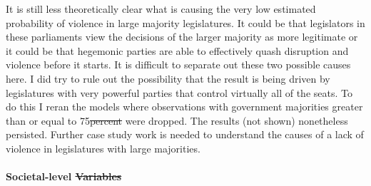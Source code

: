 \documentclass[a4paper]{article}\usepackage[]{graphicx}\usepackage[]{color}
\providecommand{\DIFaddtex}[1]{{\protect\color{blue}\uwave{#1}}} %
\providecommand{\DIFdeltex}[1]{{\protect\color{red}\sout{#1}}}                      %
\providecommand{\DIFaddbegin}{} %
\providecommand{\DIFaddend}{} %
\providecommand{\DIFdelbegin}{} %
\providecommand{\DIFdelend}{} %
\providecommand{\DIFadd}[1]{\texorpdfstring{\DIFaddtex{#1}}{#1}} %
\providecommand{\DIFdel}[1]{\texorpdfstring{\DIFdeltex{#1}}{}} %
\begin{document}
It is still less theoretically clear what is causing the very low estimated probability of violence in large majority legislatures. It could be that legislators in these parliaments view the decisions of the larger majority as more legitimate or it could be that hegemonic parties are able to effectively quash disruption and violence before it starts. It is difficult to separate out these two possible causes here. I did try to rule out the possibility that the result is being driven by legislatures with very powerful parties that control virtually all of the seats. To do this I reran the models where observations with government majorities greater than or equal to 75\DIFdelbegin \DIFdel{percent }\DIFdelend \DIFaddbegin \DIFadd{\% }\DIFaddend were dropped. The results (not shown) nonetheless persisted. Further case study work is needed to understand the causes of a lack of violence in legislatures with large majorities.

\paragraph{Societal-level \DIFdelbegin \DIFdel{Variables}\DIFdelend \DIFaddbegin \DIFadd{variables}\DIFaddend }
\end{document}
